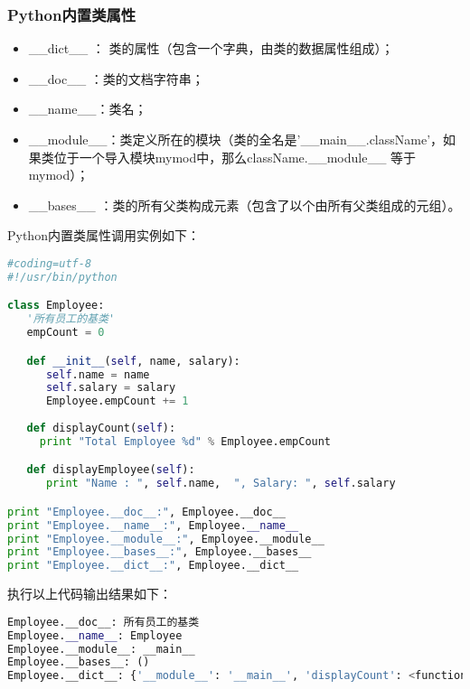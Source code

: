\subsubsection{Python内置类属性}
\begin{itemize}
\item \_\_dict\_\_ ： 类的属性（包含一个字典，由类的数据属性组成）；
\item \_\_doc\_\_ ：类的文档字符串；
\item \_\_name\_\_：类名；
\item \_\_module\_\_：类定义所在的模块（类的全名是'\_\_main\_\_.className'，如果类位于一个导入模块mymod中，那么className.\_\_module\_\_ 等于 mymod）；
\item \_\_bases\_\_ ：类的所有父类构成元素（包含了以个由所有父类组成的元组）。
\end{itemize}
Python内置类属性调用实例如下：
\begin{lstlisting}[language=Python]
#coding=utf-8
#!/usr/bin/python

class Employee:
   '所有员工的基类'
   empCount = 0

   def __init__(self, name, salary):
      self.name = name
      self.salary = salary
      Employee.empCount += 1
   
   def displayCount(self):
     print "Total Employee %d" % Employee.empCount

   def displayEmployee(self):
      print "Name : ", self.name,  ", Salary: ", self.salary

print "Employee.__doc__:", Employee.__doc__
print "Employee.__name__:", Employee.__name__
print "Employee.__module__:", Employee.__module__
print "Employee.__bases__:", Employee.__bases__
print "Employee.__dict__:", Employee.__dict__
\end{lstlisting}
执行以上代码输出结果如下：
\begin{lstlisting}[language=Python]
Employee.__doc__: 所有员工的基类
Employee.__name__: Employee
Employee.__module__: __main__
Employee.__bases__: ()
Employee.__dict__: {'__module__': '__main__', 'displayCount': <function displayCount at 0x10a939c80>, 'empCount': 0, 'displayEmployee': <function displayEmployee at 0x10a93caa0>, '__doc__': '\xe6\x89\x80\xe6\x9c\x89\xe5\x91\x98\xe5\xb7\xa5\xe7\x9a\x84\xe5\x9f\xba\xe7\xb1\xbb', '__init__': <function __init__ at 0x10a939578>}
\end{lstlisting}




